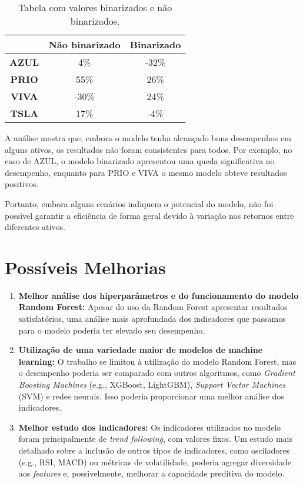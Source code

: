 \documentclass{article}
\begin{document}
\begin{table}[h!]
\centering
\begin{tabular}{|c|c|c|}
\hline
\rowcolor{white!20} 
\textbf{}      & \textbf{Não binarizado} & \textbf{Binarizado} \\ \hline
\textbf{AZUL}  & \cellcolor{green!30}4\%  & \cellcolor{red!30}-32\% \\ \hline
\textbf{PRIO}  & \cellcolor{green!30}55\% & \cellcolor{green!30}26\% \\ \hline
\textbf{VIVA}  & \cellcolor{red!30}-30\% & \cellcolor{green!30}24\% \\ \hline
\textbf{TSLA}  & \cellcolor{green!30}17\% & \cellcolor{red!30}-4\%  \\ \hline
\end{tabular}
\caption{Tabela com valores binarizados e não binarizados.}
\end{table}

A análise mostra que, embora o modelo tenha alcançado bons desempenhos em alguns ativos, os resultados não foram consistentes para todos. Por exemplo, no caso de AZUL, o modelo binarizado apresentou uma queda significativa no desempenho, enquanto para PRIO e VIVA o mesmo modelo obteve resultados positivos.

Portanto, embora alguns cenários indiquem o potencial do modelo, não foi possível garantir a eficiência de forma geral devido à variação nos retornos entre diferentes ativos.

\newpage
\section{Possíveis Melhorias}

\begin{enumerate}
    \item \textbf{Melhor análise dos hiperparâmetros e do funcionamento do modelo Random Forest:}  
    Apesar do uso da Random Forest apresentar resultados satisfatórios, uma análise mais aprofundada dos indicadores que passamos para o modelo poderia ter elevado seu desempenho.

    \item \textbf{Utilização de uma variedade maior de modelos de machine learning:}  
    O trabalho se limitou à utilização do modelo Random Forest, mas o desempenho poderia ser comparado com outros algoritmos, como \textit{Gradient Boosting Machines} (e.g., XGBoost, LightGBM), \textit{Support Vector Machines} (SVM) e redes neurais. Isso poderia proporcionar uma melhor análise dos indicadores.

    \item \textbf{Melhor estudo dos indicadores:}  
    Os indicadores utilizados no modelo foram principalmente de \textit{trend following}, com valores fixos. Um estudo mais detalhado sobre a inclusão de outros tipos de indicadores, como osciladores (e.g., RSI, MACD) ou métricas de volatilidade, poderia agregar diversidade aos \textit{features} e, possivelmente, melhorar a capacidade preditiva do modelo.
\end{enumerate}
\end{document}

